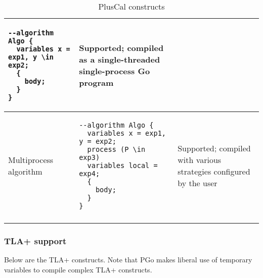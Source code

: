 \begin{center}
\begin{longtable}{ || m{} | m{} | m{} || }
\begin{lstlisting}[language=pcal]
--algorithm Algo {
  variables x = exp1, y \in exp2;
  {
  	body;
  }
}
	\end{lstlisting} &
	Supported; compiled as a single-threaded single-process Go program \\
	\hline
	Multiprocess algorithm &
	\begin{lstlisting}[language=pcal]
--algorithm Algo {
  variables x = exp1, y = exp2;
  process (P \in exp3)
  variables local = exp4;
  {
  	body;
  }
}
	\end{lstlisting} &
	Supported; compiled with various strategies configured by the user \\
	\hline
	\caption{PlusCal constructs}
	\label{table:pcal-constructs}
\end{longtable}
\end{center}

\clearpage

\subsubsection{TLA+ support}

Below are the TLA+ constructs. Note that PGo makes liberal use of temporary variables to compile complex TLA+ constructs.


